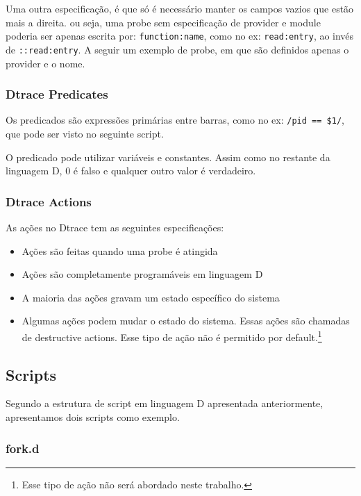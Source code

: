 \documentclass[a4paper]{scrartcl}
\newcommand{\code}[1]{}
\begin{document}
Uma outra especificação, é que só é necessário manter os campos vazios que estão mais a direita. ou seja, uma probe sem especificação de provider e module poderia ser apenas escrita por: {\tt function:name}, como no ex: {\tt read:entry}, ao invés de {\tt ::read:entry}. A seguir um exemplo de probe, em que são definidos apenas o provider e o nome.

\code{one_syscall_entry.d}

\subsubsection{Dtrace Predicates}

Os predicados são expressões primárias entre barras, como no ex: {\tt /pid == \$1/}, que pode ser visto no seguinte script.

\code{syscalls2.d}

O predicado pode utilizar variáveis e constantes. Assim como no restante da linguagem D, 0 é falso e qualquer outro valor é verdadeiro.

\subsubsection{Dtrace Actions}

As ações no Dtrace tem as seguintes especificações:

\begin{itemize}
	\item Ações são feitas quando uma probe é atingida
	\item Ações são completamente programáveis em linguagem D
	\item A maioria das ações gravam um estado específico do sistema
	\item Algumas ações podem mudar o estado do sistema. Essas ações são chamadas de destructive actions. Esse tipo de ação não é permitido por default.\footnote{Esse tipo de ação não será abordado neste trabalho.}
\end{itemize}

\subsection{Scripts}

Segundo a estrutura de script em linguagem D apresentada anteriormente, apresentamos dois scripts como exemplo.

\newpage

\subsubsection{fork.d}
\end{document}
